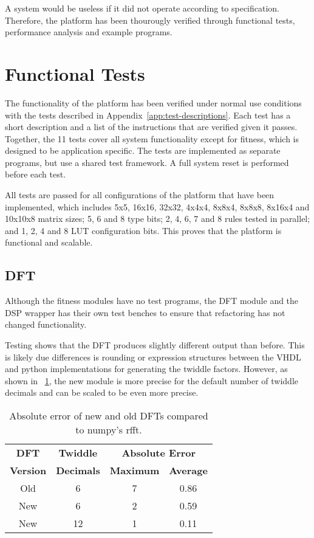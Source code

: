 A system would be useless if it did not operate according to specification.
Therefore, the platform has been thourougly verified through functional tests, performance analysis and example programs.


\section{Functional Tests}

The functionality of the platform has been verified under normal use conditions with the tests described in Appendix~\ref{app:test-descriptions}.
Each test has a short description and a list of the instructions that are verified given it passes.
Together, the 11 tests cover all system functionality except for fitness, which is designed to be application specific.
The tests are implemented as separate programs, but use a shared test framework.
A full system reset is performed before each test.

All tests are passed for all configurations of the platform that have been implemented, which includes 5x5, 16x16, 32x32, 4x4x4, 8x8x4, 8x8x8, 8x16x4 and 10x10x8 matrix sizes; 5, 6 and 8 type bits; 2, 4, 6, 7 and 8 rules tested in parallel; and 1, 2, 4 and 8 LUT configuration bits.
This proves that the platform is functional and scalable.

\subsection{DFT}

Although the fitness modules have no test programs, the DFT module and the DSP wrapper has their own test benches to ensure that refactoring has not changed functionality.

Testing shows that the DFT produces slightly different output than before.
This is likely due differences is rounding or expression structures between the VHDL and python implementations for generating the twiddle factors.
However, as shown in \tablename~\ref{tab:dft-precision}, the new module is more precise for the default number of twiddle decimals and can be scaled to be even more precise.

\begin{table}[!ht]
    \renewcommand{\arraystretch}{1.4}
    \centering
    \begin{tabular}{c|c|c|c}
        \bfseries DFT & \bfseries Twiddle & \multicolumn{2}{c}{\bfseries Absolute Error} \\
        \bfseries Version & \bfseries Decimals & \bfseries Maximum & \bfseries Average \\
        \hline
        Old & 6 & 7 & 0.86 \\
        New & 6 & 2 & 0.59 \\
        New & 12 & 1 & 0.11 \\
    \end{tabular}
    \caption[DFT error]{
        Absolute error of new and old DFTs compared to numpy's rfft.
    }
    \label{tab:dft-precision}
\end{table}

